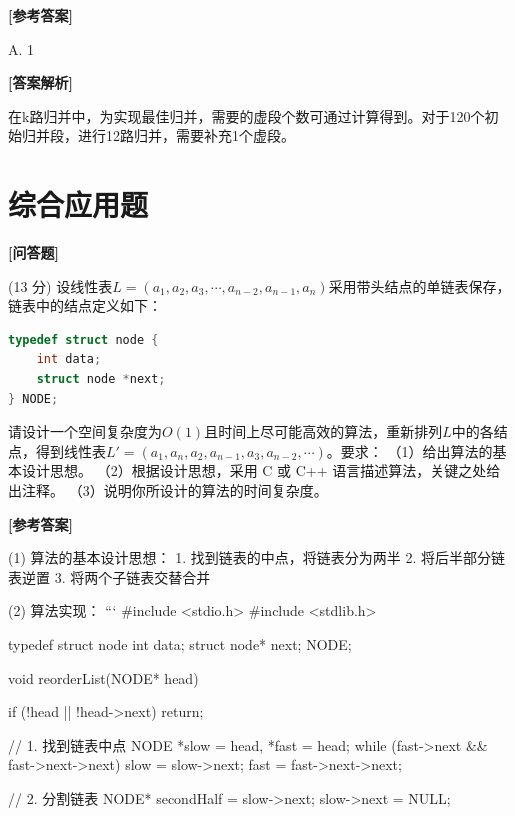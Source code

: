 \documentclass[12pt,a4paper]{article}
\newenvironment{choicequestion}[1][]{%
    \vspace{0.5cm}
    \noindent\textbf{[#1]}
    \vspace{0.2cm}
}{}
\newenvironment{answersection}{%
    \vspace{0.2cm}
    \noindent\textbf{[参考答案]}\\
    \vspace{0.1cm}
}{}
\newenvironment{analysissection}{%
    \vspace{0.2cm}
    \noindent\textbf{[答案解析]}\\
    \vspace{0.1cm}
}{}
\newcounter{questioncounter}
\newcommand{\question}[1]{%
    \stepcounter{questioncounter}%
    \noindent\textbf{\thequestioncounter} #1%
}
\begin{document}
\begin{answersection}
A. 1
\end{answersection}

\begin{analysissection}
在k路归并中，为实现最佳归并，需要的虚段个数可通过计算得到。对于120个初始归并段，进行12路归并，需要补充1个虚段。
\end{analysissection}
\end{choicequestion}

\section{综合应用题}

\begin{choicequestion}[问答题]
\question{(13 分) 设线性表$L=(a_1,a_2,a_3,\cdots,a_{n-2},a_{n-1},a_n)$采用带头结点的单链表保存，链表中的结点定义如下：\newline

\begin{lstlisting}[language=C]
typedef struct node {
    int data;
    struct node *next;
} NODE;
\end{lstlisting}\newline

请设计一个空间复杂度为$O(1)$且时间上尽可能高效的算法，重新排列$L$中的各结点，得到线性表$L'=(a_1,a_n,a_2,a_{n-1},a_3,a_{n-2},\cdots)$。要求：\newline
（1）给出算法的基本设计思想。\newline
（2）根据设计思想，采用 C 或 C++ 语言描述算法，关键之处给出注释。\newline
（3）说明你所设计的算法的时间复杂度。}

\begin{answersection}
(1) 算法的基本设计思想：
1. 找到链表的中点，将链表分为两半
2. 将后半部分链表逆置
3. 将两个子链表交替合并

(2) 算法实现：
```
#include <stdio.h>
#include <stdlib.h>

typedef struct node {
    int data;
    struct node* next;
} NODE;

void reorderList(NODE* head) {
    if (!head || !head->next) return;
    
    // 1. 找到链表中点
    NODE *slow = head, *fast = head;
    while (fast->next && fast->next->next) {
        slow = slow->next;
        fast = fast->next->next;
    }
    
    // 2. 分割链表
    NODE* secondHalf = slow->next;
    slow->next = NULL;
    
}
\end{answersection}
\end{choicequestion}
\end{document}
